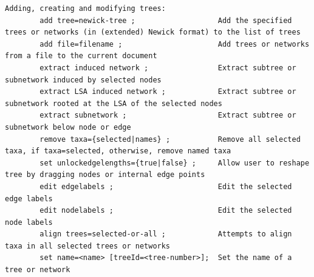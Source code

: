 \documentclass[11pt]{article}
\begin{document}
\begin{verbatim}
Adding, creating and modifying trees:
        add tree=newick-tree ;                   Add the specified trees or networks (in (extended) Newick format) to the list of trees
        add file=filename ;                      Add trees or networks from a file to the current document
        extract induced network ;                Extract subtree or subnetwork induced by selected nodes
        extract LSA induced network ;            Extract subtree or subnetwork rooted at the LSA of the selected nodes        
        extract subnetwork ;                     Extract subtree or subnetwork below node or edge
        remove taxa={selected|names} ;           Remove all selected taxa, if taxa=selected, otherwise, remove named taxa
        set unlockedgelengths={true|false} ;     Allow user to reshape tree by dragging nodes or internal edge points
        edit edgelabels ;                        Edit the selected edge labels
        edit nodelabels ;                        Edit the selected node labels
        align trees=selected-or-all ;            Attempts to align taxa in all selected trees or networks
        set name=<name> [treeId=<tree-number>];  Set the name of a tree or network
        


\end{verbatim}
\end{document}
